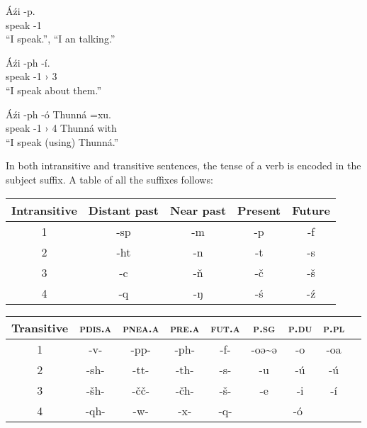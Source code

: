 \documentclass[11pt]{article} %
\begin{document}
\begin{exe}  
  \ex
  \gll Áźi  -p.\\
	   speak     -\textsc{1}\\
  \glt ``I speak.'', ``I an talking.''
  
  \ex
  \gll Áźi  -ph -í.\\
	   speak     -\textsc{1 ›} \textsc{3} \\
  \glt ``I speak about them.''
  
	\ex
  \gll Áźi  -ph -ó Thunná =xu.\\
	   speak     -\textsc{1 ›} \textsc{4} Thunná with\\
  \glt ``I speak (using) Thunná.''
\end{exe}

In both intransitive and transitive sentences, the tense of a verb is encoded in the subject suffix. A table of all the suffixes follows:

\begin{center}
	\begin{tabular}{|c||c|c|c|c|}
				\hline
				\textbf{Intransitive} & Distant past & Near past   & Present & Future  \\ \hline\hline
				\textsc{1}            & -sp          & -m          & -p      & -f      \\ \hline
				\textsc{2}            & -ht          & -n          & -t      & -s      \\ \hline
				\textsc{3}            & -c           & -ň          & -č      & -š      \\ \hline
				\textsc{4}            & -q           & -ŋ          & -ś      & -ź      \\ \hline
	\end{tabular} 
\end{center}

\begin{center}
	\begin{tabular}{|c||c|c|c|c|c|c|c|c|}
				\hline
				\textbf{Transitive} & \textsc{pdis.a} & \textsc{pnea.a} & \textsc{pre.a} & \textsc{fut.a} & \textsc{p.sg}         & \textsc{p.du} & \textsc{p.pl}\\ \hline\hline
				\textsc{1}          & -v-             & -pp-            & -ph-           & -f-            & -oə\textasciitilde{}ə & -o            & -oa          \\ \hline
				\textsc{2}          & -sh-            & -tt-            & -th-           & -s-            & -u                    & -ú            & -ú           \\ \hline
				\textsc{3}          & -šh-            & -čč-            & -čh-           & -š-            & -e                    & -i            & -í           \\ \hline
				\textsc{4}          & -qh-            & -w-             & -x-            & -q-            & \multicolumn{3}{c|}{-ó}                              \\ \hline
	\end{tabular} 
\end{center}
\end{document}
